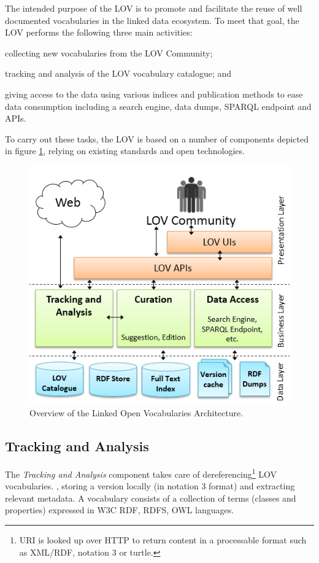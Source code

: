 \documentclass{iosart2c}
\begin{document}
The intended purpose of the LOV is to promote and facilitate the reuse of well documented vocabularies in the linked data ecosystem. To meet that goal, the LOV performs the following three main activities: 
\begin{inparaenum}[1)] 
  \item collecting new vocabularies from the LOV Community;
  \item tracking and analysis of the LOV vocabulary catalogue; and
  \item giving access to the data using various indices and publication methods to ease data consumption including a search engine, data dumps, SPARQL endpoint and APIs.
\end{inparaenum}
To carry out these tasks, the LOV is based on a number of components depicted in figure \ref{fig:arch}, relying on existing standards and open technologies.

\begin{figure}[ht!b]
\includegraphics[scale=0.6]{lov_architecture.png}
\caption{Overview of the Linked Open Vocabularies Architecture.}
\label{fig:arch}
\end{figure}

\subsection{Tracking and Analysis}
	The \emph{Tracking and Analysis} component takes care of dereferencing\footnote{URI is looked up over HTTP to return content in a processable format such as XML/RDF, notation 3 or turtle.} LOV vocabularies. , storing a version locally (in notation 3 format) and extracting relevant metadata. A vocabulary consists of a collection of terms (classes and properties) expressed in W3C RDF, RDFS, OWL languages. 
\end{document}
